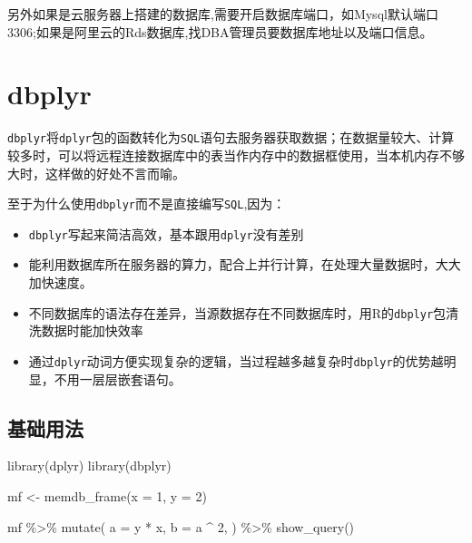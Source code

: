 \documentclass[
]{book}
\newenvironment{Shaded}{\begin{snugshade}}{\end{snugshade}}
\newcommand{\AttributeTok}[1]{\textcolor[rgb]{0.77,0.63,0.00}{#1}}
\newcommand{\DecValTok}[1]{\textcolor[rgb]{0.00,0.00,0.81}{#1}}
\newcommand{\FunctionTok}[1]{\textcolor[rgb]{0.00,0.00,0.00}{#1}}
\newcommand{\NormalTok}[1]{#1}
\newcommand{\OtherTok}[1]{\textcolor[rgb]{0.56,0.35,0.01}{#1}}
\newcommand{\SpecialCharTok}[1]{\textcolor[rgb]{0.00,0.00,0.00}{#1}}
\begin{document}
另外如果是云服务器上搭建的数据库,需要开启数据库端口，如Mysql默认端口3306;如果是阿里云的Rds数据库,找DBA管理员要数据库地址以及端口信息。

\hypertarget{dbplyr}{%
\section{dbplyr}\label{dbplyr}}

\texttt{dbplyr}将\texttt{dplyr}包的函数转化为\texttt{SQL}语句去服务器获取数据；在数据量较大、计算较多时，可以将远程连接数据库中的表当作内存中的数据框使用，当本机内存不够大时，这样做的好处不言而喻。

至于为什么使用\texttt{dbplyr}而不是直接编写\texttt{SQL},因为：

\begin{itemize}
\item
  \texttt{dbplyr}写起来简洁高效，基本跟用\texttt{dplyr}没有差别
\item
  能利用数据库所在服务器的算力，配合上并行计算，在处理大量数据时，大大加快速度。
\item
  不同数据库的语法存在差异，当源数据存在不同数据库时，用R的\texttt{dbplyr}包清洗数据时能加快效率
\item
  通过\texttt{dplyr}动词方便实现复杂的逻辑，当过程越多越复杂时\texttt{dbplyr}的优势越明显，不用一层层嵌套语句。
\end{itemize}

\hypertarget{ux57faux7840ux7528ux6cd5-1}{%
\subsection{基础用法}\label{ux57faux7840ux7528ux6cd5-1}}

\begin{Shaded}
\begin{Highlighting}[]
\FunctionTok{library}\NormalTok{(dplyr)}
\FunctionTok{library}\NormalTok{(dbplyr)}

\NormalTok{mf }\OtherTok{\textless{}{-}} \FunctionTok{memdb\_frame}\NormalTok{(}\AttributeTok{x =} \DecValTok{1}\NormalTok{, }\AttributeTok{y =} \DecValTok{2}\NormalTok{)}

\NormalTok{mf }\SpecialCharTok{\%\textgreater{}\%} 
  \FunctionTok{mutate}\NormalTok{(}
    \AttributeTok{a =}\NormalTok{ y }\SpecialCharTok{*}\NormalTok{ x, }
    \AttributeTok{b =}\NormalTok{ a }\SpecialCharTok{\^{}} \DecValTok{2}\NormalTok{,}
\NormalTok{  ) }\SpecialCharTok{\%\textgreater{}\%} 
  \FunctionTok{show\_query}\NormalTok{()}
\end{Highlighting}
\end{Shaded}
\end{document}
